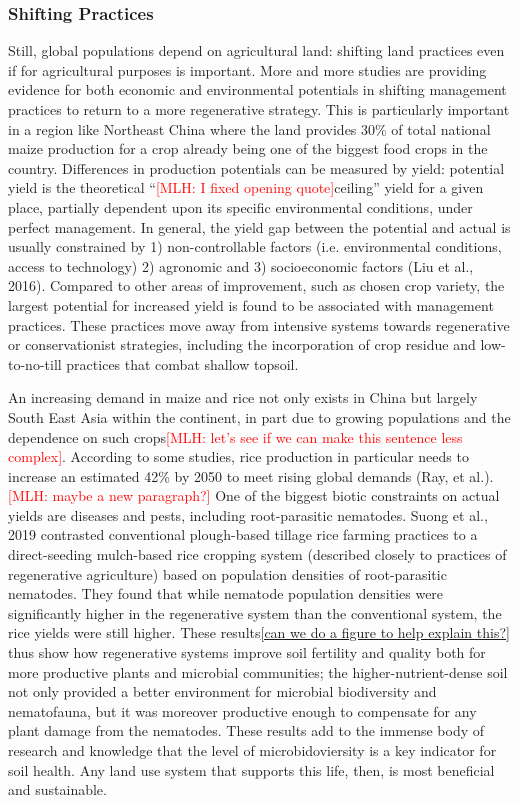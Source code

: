 \documentclass{book}\usepackage{knitr}
\newcommand{\red}[1]{\textcolor{red}{[MLH: #1]}}
\begin{document}
\begin{knitrout}
\begin{kframe}
\subsubsection{Shifting Practices}
Still, global populations depend on agricultural land: shifting land practices even if for agricultural purposes is important. More and more studies are providing evidence for both economic and environmental potentials in shifting management practices to return to a more regenerative strategy. This is particularly important in a region like Northeast China where the land provides 30\% of total national maize production for a crop already being one of the biggest food crops in the country. Differences in production potentials can be measured by yield: potential yield is the theoretical ``\red{I fixed opening quote}ceiling” yield for a given place, partially dependent upon its specific environmental conditions, under perfect management. In general, the yield gap between the potential and actual is usually constrained by 1) non-controllable factors (i.e. environmental conditions, access to technology) 2) agronomic and 3) socioeconomic factors (Liu et al., 2016). Compared to other areas of improvement, such as chosen crop variety, the largest potential for increased yield is found to be associated with management practices. These practices move away from intensive systems towards regenerative or conservationist strategies, including the incorporation of crop residue and low-to-no-till practices that combat shallow topsoil.

An increasing demand in maize and rice not only exists  in China but largely South East Asia within the continent, in part due to growing populations and the dependence on such crops\red{let's see if we can make this sentence less complex}. According to some studies, rice production in particular needs to increase an estimated 42\% by 2050 to meet rising global demands (Ray, et al.). \red{maybe a new paragraph?} One of the biggest biotic constraints on actual yields are diseases and pests, including root-parasitic nematodes. Suong et al., 2019 contrasted conventional plough-based tillage rice farming practices to a direct-seeding mulch-based rice cropping system (described closely to practices of regenerative agriculture) based on population densities of root-parasitic nematodes. They found that while nematode population densities were significantly higher in the regenerative system than the conventional system, the rice yields were still higher. These results\ref{can we do a figure to help explain this?} thus show how regenerative systems improve soil fertility and quality both for more productive plants and microbial communities; the higher-nutrient-dense soil not only provided a better environment for microbial biodiversity and nematofauna, but it was moreover productive enough to compensate for any plant damage from the nematodes. These results add to the immense body of research and knowledge that the level of microbidoviersity is a key indicator for soil health. Any land use system that supports this life, then, is most beneficial and sustainable.


\end{kframe}
\end{knitrout}
\end{document}
